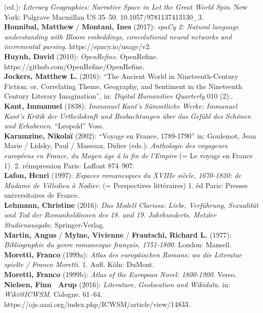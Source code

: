 \documentclass[
  12pt,
  letterpaper,
  DIV=11,
  numbers=noendperiod]{scrreprt}
\begin{document}
(ed.): \emph{Literary Geographies: Narrative Space in Let the Great
World Spin}. New York: Palgrave Macmillan US 35--50.
10.1057/9781137413130\_3.\\
\textbf{Honnibal, Matthew} / \textbf{Montani, Ines} (2017): \emph{spaCy
2: Natural language understanding with Bloom embeddings, convolutional
neural networks and incremental parsing}. https://spacy.io/usage/v2.\\
\textbf{Huynh, David} (2010): \emph{OpenRefine}. OpenRefine.
https://github.com/OpenRefine/OpenRefine.\\
\textbf{Jockers, Matthew L.} (2016): ``The Ancient World in
Nineteenth-Century Fiction; or, Correlating Theme, Geography, and
Sentiment in the Nineteenth Century Literary Imagination'', in:
\emph{Digital Humanities Quarterly} 010 (2):.\\
\textbf{Kant, Immanuel} (1838): \emph{Immanuel Kant's Sämmtliche Werke:
Immanuel Kant's Kritik der Urtheilskraft und Beobachtungen über das
Gefühl des Schönen und Erhabenen}. ``Leopold'' Voss.\\
\textbf{Karamzine, Nikolaï} (2002): ``Voyage en France, 1789-1790'' in:
Goulemot, Jean Marie / Lidsky, Paul / Masseau, Didier (eds.):
\emph{Anthologie des voyageurs européens en France, du Moyen âge á la
fin de l'Empire} (= Le voyage en France 1). 2. réimpression Paris:
Laffont 874--907.\\
\textbf{Lafon, Henri} (1997): \emph{Espaces romanesques du XVIIIe
siècle, 1670-1820: de Madame de Villedieu à Nodier}. (= Perspectives
littéraires) 1. éd Paris: Presses universitaires de France.\\
\textbf{Lehmann, Christine} (2016): \emph{Das Modell Clarissa: Liebe,
Verführung, Sexualität und Tod der Romanheldinnen des 18. und 19.
Jahrhunderts. Metzler Studienausgabe}. Springer-Verlag.\\
\textbf{Martin, Angus} / \textbf{Mylne, Vivienne} / \textbf{Frautschi,
Richard L.} (1977): \emph{Bibliographie du genre romanesque français,
1751-1800}. London: Mansell.\\
\textbf{Moretti, Franco} (1999a): \emph{Atlas des europäischen Romans:
wo die Literatur spielte / Franco Moretti}. 1. Aufl. Köln: DuMont.\\
\textbf{Moretti, Franco} (1999b): \emph{Atlas of the European Novel:
1800-1900}. Verso.\\
\textbf{Nielsen, Finn~ Arup} (2016): \emph{Literature, Geolocation and
Wikidata}. in: \emph{Wiki@ICWSM}. Cologne. 61--64.
https://ojs.aaai.org/index.php/ICWSM/article/view/14833.\\
\end{document}

